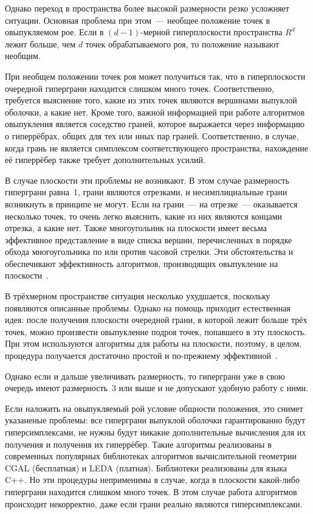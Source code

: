 \documentclass[14pt]{extarticle}
\begin{document}
Однако переход в пространства более высокой размерности резко усложняет ситуации. Основная проблема при этом~--- необщее положение точек в овыпукляемом рое. Если в $(d-1)$-мерной гиперплоскости пространства $R^d$ лежит больше, чем $d$ точек обрабатываемого роя, то положение называют необщим.

При необщем положении точек роя может получиться так, что в гиперплоскости очередной гиперграни находится слишком много точек. Соответственно, требуется выяснение того, какие из этих точек являются вершинами выпуклой оболочки, а какие нет. Кроме того, важной информацией при работе алгоритмов овыпукления является соседство граней, которое выражается через информацию о гиперрёбрах, общих для тех или иных пар граней. Соответственно, в случае, когда грань не является симплексом соответствующего пространства, нахождение её гиперрёбер также требует дополнительных усилий.

В случае плоскости эти проблемы не возникают. В этом случае размерность гиперграни равна~1, грани являются отрезками, и несимплициальные грани возникнуть в принципе не могут. Если на грани~--- на отрезке~--- оказывается несколько точек, то очень легко выяснить, какие из них являются концами отрезка, а какие нет. Также многоугольник на плоскости имеет весьма эффективное представление в виде списка вершин, перечисленных в порядке обхода многоугольника по или против часовой стрелки. Эти обстоятельства и обеспечивают эффективность алгоритмов, производящих овыпукление на плоскости~\cite{bib:preparata:eng,bib:preparata,bib:deBerg}.

В трёхмерном пространстве ситуация несколько ухудшается, поскольку появляются описанные проблемы. Однако на помощь приходит естественная идея: после получения плоскости очередной грани, в которой лежит больше трёх точек, можно произвести овыпукление подроя точек, попавшего в эту плоскость. При этом используются алгоритмы для работы на плоскости, поэтому, в целом, процедура получается достаточно простой и по-прежнему эффективной~\cite{bib:Ivanov}.

Однако если и дальше увеличивать размерность, то гиперграни уже в свою очередь имеют размерность~3 или выше и не допускают удобную работу с ними.

Если наложить на овыпукляемый рой условие общности положения, это снимет указаненые проблемы: все гиперграни выпуклой оболочки гарантированно будут гиперсимплексами, не нужны будут никакие дополнительные вычисления для их получения и получения их гиперрёбер. Такие алгоритмы реализованы в современных популярных библиотеках алгоритмов вычислительной геометрии CGAL (бесплатная) и LEDA (платная). Библиотеки реализованы для языка C++. Но эти процедуры неприменимы в случае, когда в плоскости какой-либо гиперграни находится слишком много точек. В этом случае работа алгоритмов происходит некорректно, даже если грани реально являются гиперсимплексами.
\end{document}

